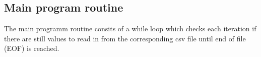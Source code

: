 \subsection{Main program routine}
The main programm routine consits of a while loop which checks each iteration if there are still values to read in from the corresponding csv file until end of file (EOF) is reached. 